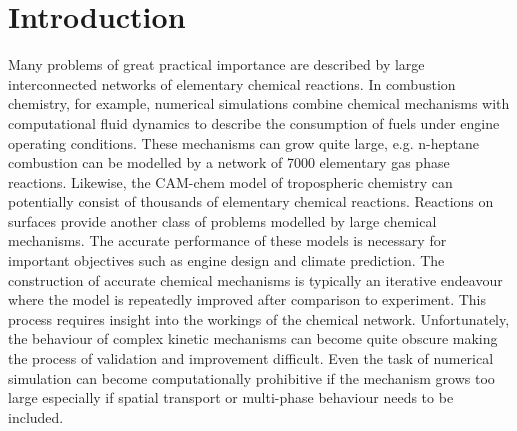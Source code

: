 \chapter{Introduction}
\label{introchap}
Many problems of great practical importance are described by large interconnected networks
of elementary chemical reactions.\cite{ch1_IRPC_1_laidler1987chemical,ch1_IRPC_2_pilling1996reaction,ch1_IRPC_3_steinfeld1989chemical} In combustion chemistry, for example,
numerical simulations combine chemical mechanisms with computational fluid dynamics
to describe the consumption of fuels under engine operating conditions.\cite{ch1_IRPC_4_warnatz2017combustion,ch1_IRPC_5_westbrook2000chemical,ch1_IRPC_6_miller1990chemical,ch1_IRPC_7_battin2008detailed,ch1_IRPC_8_zador2011kinetics} These
mechanisms can grow quite large, e.g. n-heptane combustion can be modelled by a network
of 7000 elementary gas phase reactions.\cite{ch1_IRPC_9_curran1998comprehensive} Likewise, the CAM-chem model of
tropospheric chemistry can potentially consist of thousands of elementary chemical
reactions.\cite{ch1_IRPC_10_lamarque2012cam} Reactions on surfaces provide another class of problems modelled by
large chemical mechanisms.\cite{ch1_IRPC_11_somorjai2010introduction,ch1_IRPC_12_hammer2000theoretical} The accurate performance of these models is necessary
for important objectives such as engine design\cite{ch1_IRPC_13_som2013quantum} and climate prediction.\cite{ch1_IRPC_14_lamarque2013atmospheric}
The construction of accurate chemical mechanisms is typically an iterative endeavour
where the model is repeatedly improved after comparison to experiment. This process
requires insight into the workings of the chemical network. Unfortunately, the behaviour
of complex kinetic mechanisms can become quite obscure making the process of
validation and improvement difficult. Even the task of numerical simulation can
become computationally prohibitive if the mechanism grows too large especially if spatial
transport or multi-phase behaviour needs to be included.
\newline
